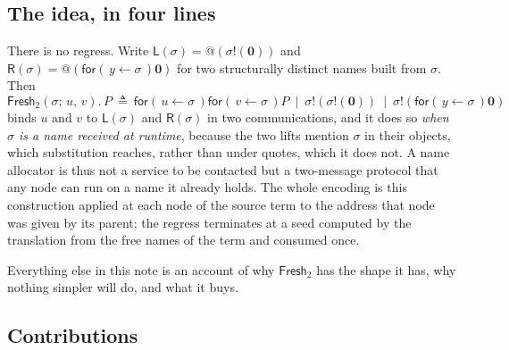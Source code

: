 \documentclass[11pt]{article}
\makeatletter
\theoremstyle{definition}
\theoremstyle{plain}
\theoremstyle{remark}
\newcommand{\quo}[1]{@#1}
\newcommand{\inp}[3]{\mathsf{for}(\,#1 \leftarrow #2\,)#3}
\newcommand{\out}[2]{#1!(#2)}
\newcommand{\nil}{\mathbf{0}}
\newcommand{\Lft}{\mathsf{L}}
\newcommand{\Rgt}{\mathsf{R}}
\newcommand{\Frsh}{\mathsf{Fresh}_2}
\makeatother
\begin{document}
\subsection*{The idea, in four lines}

There is no regress. Write $\Lft(\sigma) = \quo{(\out{\sigma}{\nil})}$
and $\Rgt(\sigma) = \quo{(\inp{y}{\sigma}{\nil})}$ for two structurally
distinct names built from $\sigma$. Then
\[
  \Frsh(\sigma;\,u,\,v).\,P
  \ \triangleq\
  \inp{u}{\sigma}{\inp{v}{\sigma}{P}}
  \ \mid\ \out{\sigma}{\out{\sigma}{\nil}}
  \ \mid\ \out{\sigma}{\inp{y}{\sigma}{\nil}}
\]
binds $u$ and $v$ to $\Lft(\sigma)$ and $\Rgt(\sigma)$ in two
communications, and it does so \emph{when $\sigma$ is a name received at
runtime}, because the two lifts mention $\sigma$ in their objects, which
substitution reaches, rather than under quotes, which it does not. A name
allocator is thus not a service to be contacted but a two-message
protocol that any node can run on a name it already holds. The whole
encoding is this construction applied at each node of the source term to
the address that node was given by its parent; the regress terminates at
a seed computed by the translation from the free names of the term and
consumed once.

Everything else in this note is an account of why $\Frsh$ has the shape it
has, why nothing simpler will do, and what it buys.

\subsection*{Contributions}
\end{document}
